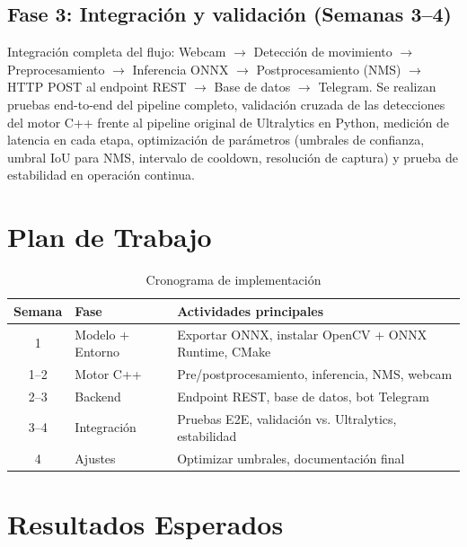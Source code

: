 \documentclass[sigconf,nonacm]{acmart}
\begin{document}
\subsection{Fase 3: Integración y validación (Semanas 3--4)}

Integración completa del flujo: Webcam $\rightarrow$ Detección de movimiento $\rightarrow$ Preprocesamiento $\rightarrow$ Inferencia ONNX $\rightarrow$ Postprocesamiento (NMS) $\rightarrow$ HTTP POST al endpoint REST $\rightarrow$ Base de datos $\rightarrow$ Telegram. Se realizan pruebas end-to-end del pipeline completo, validación cruzada de las detecciones del motor C++ frente al pipeline original de Ultralytics en Python, medición de latencia en cada etapa, optimización de parámetros (umbrales de confianza, umbral IoU para NMS, intervalo de cooldown, resolución de captura) y prueba de estabilidad en operación continua.


\section{Plan de Trabajo}


\begin{table}[h]
\centering
\begin{tabular}{|c|l|l|}
\hline
\textbf{Semana} & \textbf{Fase} & \textbf{Actividades principales} \\
\hline
1 & Modelo + Entorno & Exportar ONNX, instalar OpenCV + ONNX Runtime, CMake \\
\hline
1--2 & Motor C++ & Pre/postprocesamiento, inferencia, NMS, webcam \\
\hline
2--3 & Backend & Endpoint REST, base de datos, bot Telegram \\
\hline
3--4 & Integración & Pruebas E2E, validación vs. Ultralytics, estabilidad \\
\hline
4 & Ajustes & Optimizar umbrales, documentación final \\
\hline
\end{tabular}
\caption{Cronograma de implementación}
\end{table}


\section{Resultados Esperados}
\end{document}
